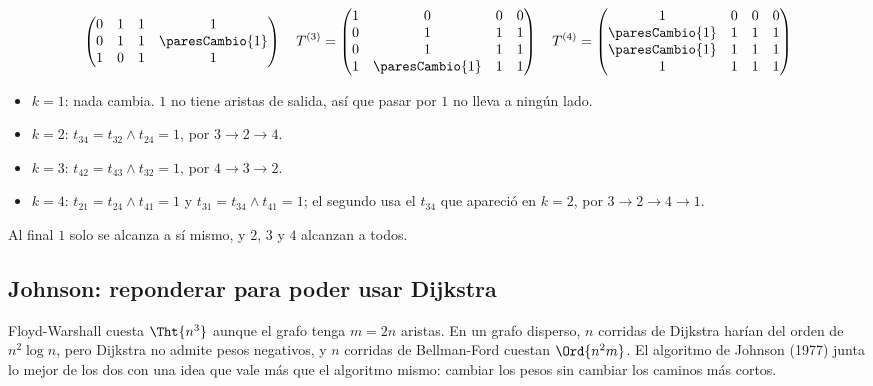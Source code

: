 \documentclass[11pt,letterpaper]{article}
\begin{document}
\begin{ejemplo}
{\[\begin{pmatrix}
    0 & 1 & 1 & 1 \\
    0 & 1 & 1 & \paresCambio{1} \\
    1 & 0 & 1 & 1
  \end{pmatrix}
  \quad
  T^{(3)} = \begin{pmatrix}
    1 & 0 & 0 & 0 \\
    0 & 1 & 1 & 1 \\
    0 & 1 & 1 & 1 \\
    1 & \paresCambio{1} & 1 & 1
  \end{pmatrix}
  \quad
  T^{(4)} = \begin{pmatrix}
    1 & 0 & 0 & 0 \\
    \paresCambio{1} & 1 & 1 & 1 \\
    \paresCambio{1} & 1 & 1 & 1 \\
    1 & 1 & 1 & 1
  \end{pmatrix}
  \]
  }%
  \begin{itemize}[itemsep=0.1em]
    \item $k = 1$: nada cambia. $1$ no tiene aristas de salida, así que
          pasar por $1$ no lleva a ningún lado.
    \item $k = 2$: $t_{34} = t_{32} \land t_{24} = 1$, por
          $3 \to 2 \to 4$.
    \item $k = 3$: $t_{42} = t_{43} \land t_{32} = 1$, por
          $4 \to 3 \to 2$.
    \item $k = 4$: $t_{21} = t_{24} \land t_{41} = 1$ y
          $t_{31} = t_{34} \land t_{41} = 1$; el segundo usa el $t_{34}$
          que apareció en $k = 2$, por $3 \to 2 \to 4 \to 1$.
  \end{itemize}
  Al final $1$ solo se alcanza a sí mismo, y $2$, $3$ y $4$ alcanzan a
  todos.
\end{ejemplo}


\subsection*{Johnson: reponderar para poder usar Dijkstra}

Floyd-Warshall cuesta $\Tht{n^3}$ aunque el grafo tenga $m = 2n$
aristas. En un grafo disperso, $n$ corridas de Dijkstra harían del
orden de $n^2 \log n$, pero Dijkstra no admite pesos negativos, y $n$
corridas de Bellman-Ford cuestan $\Ord{n^2 m}$. El algoritmo de
Johnson (1977) junta lo mejor de los dos con una idea que vale más que
el algoritmo mismo: cambiar los pesos sin cambiar los caminos más
cortos.
\end{document}

